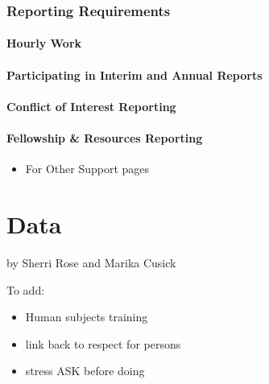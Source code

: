 \documentclass[
]{book}
\providecommand{\tightlist}{%
  \setlength{\itemsep}{0pt}\setlength{\parskip}{0pt}}
\begin{document}
\hypertarget{reporting-requirements}{%
\subsection{Reporting Requirements}\label{reporting-requirements}}

\hypertarget{hourly-work}{%
\subsubsection*{Hourly Work}\label{hourly-work}}

\hypertarget{participating-in-interim-and-annual-reports}{%
\subsubsection*{Participating in Interim and Annual Reports}\label{participating-in-interim-and-annual-reports}}

\hypertarget{conflict-of-interest-reporting}{%
\subsubsection*{Conflict of Interest Reporting}\label{conflict-of-interest-reporting}}

\hypertarget{fellowship-resources-reporting}{%
\subsubsection*{Fellowship \& Resources Reporting}\label{fellowship-resources-reporting}}

\begin{itemize}
\tightlist
\item
  For Other Support pages
\end{itemize}

\hypertarget{data}{%
\chapter{Data}\label{data}}

by Sherri Rose and Marika Cusick

To add:

\begin{itemize}
\tightlist
\item
  Human subjects training
\item
  link back to respect for persons
\item
  stress ASK before doing
\end{itemize}
\end{document}
